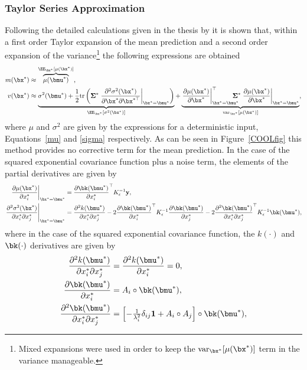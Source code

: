 \subsubsection{Taylor Series Approximation}
Following the detailed calculations given in the thesis by \cite{GRM02} it is shown that, within a first order Taylor expansion of the mean prediction and a second order expansion of the variance\footnote{Mixed expansions were used in order to keep the $\mathrm{var}_{\bx^*}[\mu(\bx^*)]$ term in the variance manageable.} the following expressions are obtained
\begin{align} 
m(\bx^*) &\approx
\overbrace{
\mu(\bmu^*)
}^{\EE_{\bx^*}[\mu(\bx^*)]},  \label{taylormean}\\
v(\bx^*) &\approx
\underbrace{
\sigma^2(\bmu^*)  +
\frac{1}{2}\mathrm{tr} \left( \mathbf{\Sigma}^*
\left.\frac{\partial^2\sigma^2(\bx^*)}{\partial\bx^*\partial\bx^{*\top}}\right|_{\bx^*=\bmu^*} \right)
}_{\EE_{\bx^*}[\sigma^2(\bx^*)]}  +
\underbrace{
\left.\frac{\partial\mu(\bx^*)}{\partial\bx^*}\right|_{\bx^*=\bmu^*}^\top
\!\!\!\!\!\!\!\mathbf{\Sigma}^*
\left.\frac{\partial\mu(\bx^*)}{\partial\bx^*}\right|_{\bx^*=\bmu^*}
}_{\mathrm{var}_{\bx^*}[\mu(\bx^*)]} ,  \label{taylorvar}
\end{align}
where $\mu$ and $\sigma^2$ are given by the expressions for a deterministic input, Equations~\eqref{mu} and \eqref{sigma} respectively. As can be seen in Figure~\ref{COOLfig} this method provides no corrective term for the mean prediction. In the case of the squared exponential covariance function plus a noise term, the elements of the partial derivatives are given by
\begin{align}
\left.\frac{\partial\mu(\bx^*)}{\partial x^*_{i}}\right
|_{\bx^*=\bmu^*} 
&=
\frac{\partial \bk(\bmu^*)}{\partial x^*_{i}}^\top
K_\epsilon^{-1} \mathbf{y}, 
\\
\left.\frac{\partial^2\sigma^2(\bx^*)}{\partial x^*_{i}\partial x^*_{j}}\right
|_{\bx^*=\bmu^*} 
&=
\frac{\partial^2 k(\bmu^*)}{\partial x^*_{i}\partial x^*_{j}} - 
2\frac{\partial \bk(\bmu^*)}{\partial x^*_{i}}^\top
K_\epsilon^{-1}
\frac{\partial \bk(\bmu^*)}{\partial x^*_{j}} - 
2\frac{\partial^2 \bk(\bmu^*)}{\partial x^*_{i}\partial x^*_{j}}^\top
K_\epsilon^{-1}
\bk(\bmu^*),
\end{align}
where in the case of the squared exponential covariance function, the $k(\cdot)$ and $\bk(\cdot)$ derivatives are given by
\begin{align}
\frac{\partial^2 k(\bmu^*)}{\partial x^*_{i}\partial x^*_{j}}
&= \frac{\partial^2 k(\bmu^*)}{\partial x^*_{i}} = 0,
\\
\frac{\partial \bk(\bmu^*)}{\partial x^*_{i}}
&=
A_i  \circ  \bk(\bmu^*),
\\
\frac{\partial^2 \bk(\bmu^*)}{\partial x^*_{i}\partial x^*_{j}}
&=
\left[-\tfrac{1}{\lambda_i^2}\delta_{ij}\mathbf{1} + A_i \circ A_j  \right] \circ
\bk(\bmu^*),
\end{align}
